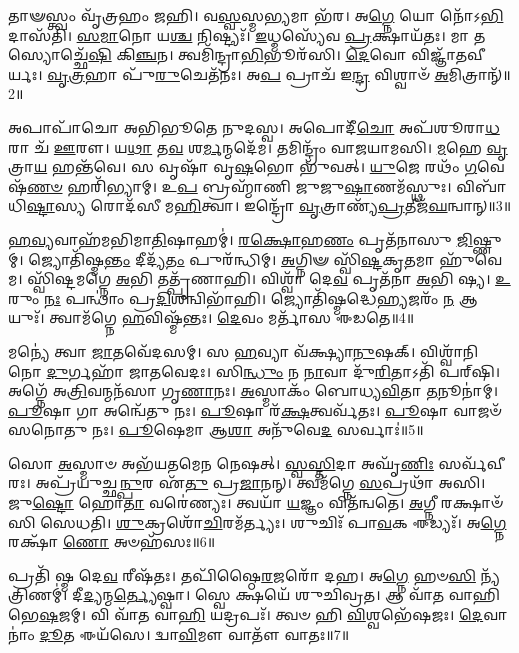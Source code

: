 𑌤𑌾𑍟𑌸𑍍𑌤𑍍𑌵𑌂 𑌵𑍃᳴𑌤𑍍𑌰𑌹𑌂 𑌜𑌹𑌿।
𑌵\-\ul{𑌸𑍍𑌵}\-𑌸𑍍𑌮\-\ul{𑌭𑍍𑌯}\-𑌮𑌾 𑌭᳴𑌰।
𑌅\-\ul{𑌗𑍍𑌨𑍇} 𑌯𑍋 𑌨𑍋᳴\-𑌽\-\ul{𑌭𑌿}\-𑌦𑌾𑌸᳴𑌤𑌿।
\-\ul{𑌸}\-\-\ul{𑌮𑌾}\-𑌨𑍋 𑌯\-\ul{𑌶𑍍𑌚} 𑌨𑌿𑌷𑍍𑌟𑍍𑌯𑌃᳴।
\-\ul{𑌇}\-𑌧𑍍𑌮𑌸𑍍𑌯𑍇᳴𑌵 \ul{𑌪𑍍𑌰}\-𑌕𑍍𑌷𑌾𑌯᳴𑌤𑌃।
𑌮𑌾 𑌤𑌸𑍍𑌯𑍋𑌚𑍍𑌛𑍇᳴\-\ul{𑌷𑌿} 𑌕𑌿\-\ul{𑌞𑍍𑌚}\-𑌨।
𑌤𑍍𑌵𑌮𑌿᳴𑌨𑍍𑌦𑍍𑌰𑌾\-\ul{𑌭𑌿}\-𑌭𑍂𑌰᳴𑌸𑌿।
\-\ul{𑌦𑍇}\-𑌵𑍋 𑌵𑌿𑌜𑍍𑌞𑌾᳴𑌤𑌵𑍀𑌰𑍍𑌯𑌃।
\-\ul{𑌵𑍃}\-\-\ul{𑌤𑍍𑌰}\-𑌹𑌾 𑌪𑍁᳴\-\ul{𑌰𑍁}\-𑌚𑍇𑌤᳴𑌨𑌃।
𑌅\-\ul{𑌪} 𑌪𑍍𑌰𑌾𑌚᳴ 𑌇\-\ul{𑌨𑍍𑌦𑍍𑌰} 𑌵𑌿𑌶𑍍𑌵𑌾𑍞᳴ \ul{𑌅}\-𑌮𑌿𑌤𑍍𑌰𑌾𑌨𑍍᳴॥2॥

𑌅𑌪𑌾𑌪𑌾᳴𑌚𑍋 𑌅𑌭𑌿𑌭𑍂𑌤𑍇 𑌨𑍁𑌦𑌸𑍍𑌵।
𑌅𑌪𑍋𑌦𑍀᳴\-\ul{𑌚𑍋} 𑌅𑌪᳴𑌶𑍂𑌰𑌾\-\ul{𑌧}\-𑌰𑌾 𑌚᳴ \ul{𑌊}\-𑌰𑍗।
𑌯\-\ul{𑌥𑌾} 𑌤\-\ul{𑌵} 𑌶\-\ul{𑌰𑍍𑌮}\-𑌨𑍍𑌮𑌦𑍇᳴𑌮।
𑌤𑌮𑌿𑌨𑍍𑌦𑍍𑌰𑌂᳴ 𑌵𑌾𑌜𑌯𑌾𑌮𑌸𑌿।
\-\ul{𑌮}\-𑌹𑍇 \ul{𑌵𑍃}\-𑌤𑍍𑌰𑌾\-\ul{𑌯} 𑌹𑌨𑍍𑌤᳴𑌵𑍇।
𑌸 𑌵𑍃𑌷𑌾᳴ 𑌵𑍃\-\ul{𑌷}\-𑌭𑍋 𑌭𑍁᳴𑌵𑌤𑍍।
\-\ul{𑌯𑍁}\-𑌜𑍇 𑌰𑌥𑌂᳴ \ul{𑌗}\-𑌵𑍇𑌷᳴\-\ul{𑌣}\-\-\ul{𑍞} 𑌹𑌰𑌿᳴𑌭𑍍𑌯𑌾𑌮𑍍।
𑌉\-\ul{𑌪} 𑌬𑍍𑌰𑌹𑍍𑌮𑌾᳴𑌣𑌿 𑌜𑍁𑌜𑍁\-\ul{𑌷𑌾}\-𑌣𑌮᳴𑌸𑍍𑌥𑍁𑌃।
𑌵𑌿𑌬𑌾᳴𑌧𑌿\-\ul{𑌷𑍍𑌟𑌾}\-𑌸𑍍𑌯 𑌰𑍋𑌦᳴𑌸𑍀 𑌮\-\ul{𑌹𑌿}\-𑌤𑍍𑌵𑌾।
𑌇𑌨𑍍𑌦𑍍𑌰𑍋᳴ \ul{𑌵𑍃}\-𑌤𑍍𑌰𑌾𑌣𑍍𑌯᳴\-\ul{𑌪𑍍𑌰}\-𑌤𑍀𑌜᳴\-\ul{𑌘}\-𑌨𑍍𑌵𑌾𑌨𑍍॥3॥

\-\ul{𑌹}\-\-\ul{𑌵𑍍𑌯}\-𑌵𑌾𑌹᳴𑌮𑌭𑌿𑌮𑌾\-\ul{𑌤𑌿}\-𑌷𑌾𑌹𑌮𑍍॑।
\-\ul{𑌰}\-\-\ul{𑌕𑍍𑌷𑍋}\-𑌹\-\ul{𑌣𑌂} 𑌪𑍃𑌤᳴𑌨𑌾𑌸𑍁 \ul{𑌜𑌿}\-𑌷𑍍𑌣𑍁𑌮𑍍।
𑌜𑍍𑌯𑍋𑌤𑌿᳴𑌷𑍍𑌮\-\ul{𑌨𑍍𑌤𑌂} 𑌦𑍀𑌦𑍍𑌯᳴\-\ul{𑌤𑌂} 𑌪𑍁𑌰᳴𑌨𑍍𑌧𑌿𑌮𑍍।
\-\ul{𑌅}\-𑌗𑍍𑌨𑌿𑍟 𑌸𑍍𑌵𑌿᳴\-\ul{𑌷𑍍𑌟}\-𑌕𑍃\-\ul{𑌤}\-𑌮𑌾 𑌹𑍁᳴𑌵𑍇𑌮।
𑌸𑍍𑌵𑌿᳴𑌷𑍍𑌟𑌮𑌗𑍍𑌨𑍇 \ul{𑌅}\-𑌭𑌿 𑌤𑌤𑍍𑌪𑍃᳴𑌣𑌾𑌹𑌿।
𑌵𑌿𑌶𑍍𑌵𑌾᳴ 𑌦𑍇\-\ul{𑌵} 𑌪𑍃𑌤᳴𑌨𑌾 \ul{𑌅}\-𑌭𑌿 𑌷𑍍𑌯।
\-\ul{𑌉}\-𑌰𑍁𑌂 \ul{𑌨𑌃} 𑌪𑌨𑍍𑌥𑌾𑌂॑ 𑌪𑍍𑌰\-\ul{𑌦𑌿}\-𑌶𑌨𑍍𑌵𑌿𑌭𑌾᳴𑌹𑌿।
𑌜𑍍𑌯𑍋𑌤𑌿᳴𑌷𑍍𑌮𑌦𑍍𑌧𑍇\-\ul{𑌹𑍍𑌯}\-𑌜𑌰𑌂᳴ \ul{𑌨} 𑌆𑌯𑍁𑌃᳴।
𑌤𑍍𑌵𑌾𑌮᳴𑌗𑍍𑌨𑍇 \ul{𑌹}\-𑌵𑌿𑌷𑍍𑌮᳴𑌨𑍍𑌤𑌃।
\-\ul{𑌦𑍇}\-𑌵𑌂 𑌮𑌰𑍍𑌤𑌾᳴𑌸 𑌈𑌡𑌤𑍇॥4॥

𑌮𑌨𑍍𑌯𑍇॑ 𑌤𑍍𑌵𑌾 \ul{𑌜𑌾}\-𑌤𑌵𑍇᳴𑌦𑌸𑌮𑍍।
𑌸 \ul{𑌹}\-𑌵𑍍𑌯𑌾 𑌵᳴𑌕𑍍𑌷𑍍𑌯𑌾\-\ul{𑌨𑍁}\-𑌷𑌕𑍍।
𑌵𑌿𑌶𑍍𑌵𑌾᳴𑌨𑌿 𑌨𑍋 \ul{𑌦𑍁}\-𑌰𑍍𑌗𑌹𑌾᳴ 𑌜𑌾𑌤𑌵𑍇𑌦𑌃।
𑌸𑌿\-\ul{𑌨𑍍𑌧𑍁𑌂} 𑌨 \ul{𑌨𑌾}\-𑌵𑌾 𑌦𑍁᳴\-\ul{𑌰𑌿}\-𑌤𑌾𑌽𑌤𑌿᳴ 𑌪𑌰𑍍‌\mbox{}𑌷𑌿।
𑌅𑌗𑍍𑌨𑍇᳴ 𑌅\-\ul{𑌤𑍍𑌰𑌿}\-𑌵𑌨𑍍𑌮𑌨᳴𑌸𑌾 𑌗𑍃\-\ul{𑌣𑌾}\-𑌨𑌃।
\-\ul{𑌅}\-𑌸𑍍𑌮𑌾𑌕𑌂᳴ 𑌬𑍋𑌧𑍍𑌯\-\ul{𑌵𑌿}\-𑌤𑌾 \ul{𑌤}\-𑌨𑍂𑌨𑌾॑𑌮𑍍।
\-\ul{𑌪𑍂}\-𑌷𑌾 𑌗𑌾 𑌅𑌨𑍍𑌵𑍇᳴𑌤𑍁 𑌨𑌃।
\-\ul{𑌪𑍂}\-𑌷𑌾 𑌰᳴\-\ul{𑌕𑍍𑌷}\-𑌤𑍍𑌵𑌰𑍍𑌵᳴𑌤𑌃।
\-\ul{𑌪𑍂}\-𑌷𑌾 𑌵𑌾𑌜𑍞᳴ 𑌸𑌨𑍋𑌤𑍁 𑌨𑌃।
\-\ul{𑌪𑍂}\-𑌷𑍇𑌮𑌾 𑌆\-\ul{𑌶𑌾} 𑌅𑌨𑍁᳴𑌵𑍇\-\ul{𑌦} 𑌸𑌰𑍍𑌵𑌾𑌃॑॥5॥

𑌸𑍋 \ul{𑌅}\-𑌸𑍍𑌮𑌾𑍞 𑌅𑌭᳴𑌯𑌤𑌮𑍇𑌨 𑌨𑍇𑌷𑌤𑍍।
\-\ul{𑌸𑍍𑌵}\-\-\ul{𑌸𑍍𑌤𑌿}\-𑌦𑌾 𑌅𑌘𑍃᳴\-\ul{𑌣𑌿𑌃} 𑌸𑌰𑍍𑌵᳴𑌵𑍀𑌰𑌃।
𑌅𑌪𑍍𑌰᳴𑌯𑍁𑌚𑍍𑌛\-\ul{𑌨𑍍𑌪𑍁}\-𑌰 𑌏᳴\-\ul{𑌤𑍁} 𑌪𑍍𑌰\-\ul{𑌜𑌾}\-𑌨𑌨𑍍।
𑌤𑍍𑌵𑌮᳴𑌗𑍍𑌨𑍇 \ul{𑌸}\-𑌪𑍍𑌰𑌥𑌾᳴ 𑌅𑌸𑌿।
𑌜𑍁\-\ul{𑌷𑍍𑌟𑍋} 𑌹𑍋\-\ul{𑌤𑌾} 𑌵𑌰𑍇॑𑌣𑍍𑌯𑌃।
𑌤𑍍𑌵𑌯𑌾᳴ \ul{𑌯}\-𑌜𑍍𑌞𑌂 𑌵𑌿𑌤᳴𑌨𑍍𑌵𑌤𑍇।
\-\ul{𑌅}\-𑌗𑍍𑌨𑍀 𑌰𑌕𑍍𑌷𑌾𑍞᳴𑌸𑌿 𑌸𑍇𑌧𑌤𑌿।
\-\ul{𑌶𑍁}\-𑌕𑍍𑌰𑌶𑍋᳴\-\ul{𑌚𑌿}\-𑌰𑌮᳴𑌰𑍍𑌤𑍍𑌯𑌃।
𑌶𑍁𑌚𑌿𑌃᳴ 𑌪𑌾\-\ul{𑌵}\-𑌕 𑌈𑌡𑍍𑌯𑌃᳴।
𑌅\-\ul{𑌗𑍍𑌨𑍇} 𑌰𑌕𑍍𑌷𑌾᳴ \ul{𑌣𑍋} 𑌅𑍞𑌹᳴𑌸𑌃॥6॥

𑌪𑍍𑌰𑌤𑌿᳴ 𑌷𑍍𑌮 𑌦𑍇\-\ul{𑌵} 𑌰𑍀𑌷᳴𑌤𑌃।
𑌤𑌪𑌿᳴𑌷𑍍𑌠𑍈\-\ul{𑌰}\-𑌜𑌰𑍋᳴ 𑌦𑌹।
𑌅\-\ul{𑌗𑍍𑌨𑍇} 𑌹𑍞\-\ul{𑌸𑌿} 𑌨𑍍𑌯᳴𑌤𑍍𑌰𑌿𑌣𑌮𑍍॑।
𑌦𑍀\-\ul{𑌦𑍍𑌯}\-𑌨𑍍𑌮\-\ul{𑌰𑍍𑌤𑍍𑌯𑍇}\-𑌷𑍍𑌵𑌾।
𑌸𑍍𑌵𑍇 𑌕𑍍𑌷𑌯𑍇᳴ 𑌶𑍁𑌚𑌿𑌵𑍍𑌰𑌤।
𑌆 𑌵𑌾᳴𑌤 𑌵𑌾𑌹𑌿 𑌭𑍇\-\ul{𑌷}\-𑌜𑌮𑍍।
𑌵𑌿 𑌵𑌾᳴𑌤 𑌵𑌾\-\ul{𑌹𑌿} 𑌯𑌦𑍍𑌰𑌪𑌃᳴।
𑌤𑍍𑌵𑍞 𑌹𑌿 \ul{𑌵𑌿}\-𑌶𑍍𑌵𑌭𑍇᳴𑌷𑌜𑌃।
\-\ul{𑌦𑍇}\-𑌵𑌾𑌨𑌾𑌂॑ \ul{𑌦𑍂}\-𑌤 𑌈𑌯᳴𑌸𑍇।
𑌦𑍍𑌵𑌾\-\ul{𑌵𑌿}\-𑌮𑍗 𑌵𑌾𑌤𑍗᳴ 𑌵𑌾𑌤𑌃॥7॥

